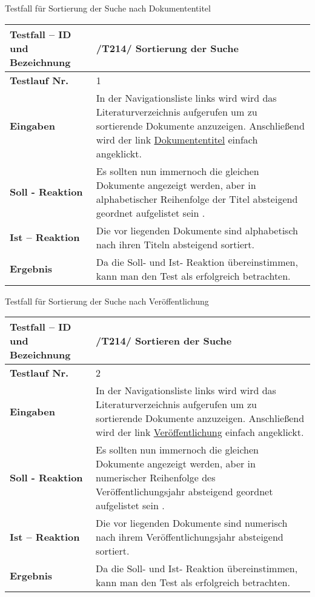 Testfall für Sortierung der Suche nach Dokumententitel\\
\begin{longtable}{|p{5cm}|p{10cm}|}
\hline
\textbf{Testfall -- ID und Bezeichnung} & \textnormal{/T214/ Sortierung der Suche} \\
\hline
\textbf{Testlauf Nr.} & \textnormal{1} \\
\hline
\textbf{Eingaben} & \textnormal{In der Navigationsliste links wird wird das Literaturverzeichnis aufgerufen um zu sortierende Dokumente anzuzeigen. Anschließend wird der link \uline{Dokumententitel} einfach angeklickt.} \\
\hline
\textbf{Soll - Reaktion} & \textnormal{Es sollten nun immernoch die gleichen Dokumente angezeigt werden, aber in alphabetischer Reihenfolge der Titel absteigend geordnet aufgelistet sein .} \\
\hline
\textbf{Ist -- Reaktion} & \textnormal{Die vor liegenden Dokumente sind alphabetisch nach ihren Titeln absteigend sortiert.} \\
\hline
\textbf{Ergebnis} & \textnormal{Da die Soll- und Ist- Reaktion übereinstimmen, kann man den Test als erfolgreich betrachten.} \\
\hline
 \end{longtable}
Testfall für Sortierung der Suche nach Veröffentlichung\\ 
\begin{longtable}{|p{5cm}|p{10cm}|}
\hline
\textbf{Testfall -- ID und Bezeichnung} & \textnormal{/T214/ Sortieren der Suche} \\
\hline
\textbf{Testlauf Nr.} & \textnormal{2} \\
\hline
\textbf{Eingaben} & \textnormal{In der Navigationsliste links wird wird das Literaturverzeichnis aufgerufen um zu sortierende Dokumente anzuzeigen. Anschließend wird der link \uline{Veröffentlichung} einfach angeklickt.} \\
\hline
\textbf{Soll - Reaktion} & \textnormal{Es sollten nun immernoch die gleichen Dokumente angezeigt werden, aber in numerischer Reihenfolge des Veröffentlichungsjahr absteigend geordnet aufgelistet sein .} \\
\hline
\textbf{Ist -- Reaktion} & \textnormal{Die vor liegenden Dokumente sind numerisch nach ihrem Veröffentlichungsjahr absteigend sortiert.} \\
\hline
\textbf{Ergebnis} & \textnormal{Da die Soll- und Ist- Reaktion übereinstimmen, kann man den Test als erfolgreich betrachten.} \\
\hline
 \end{longtable}
